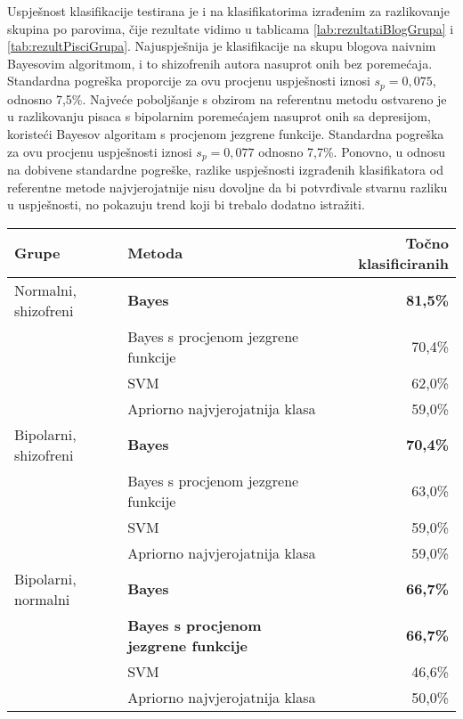 \documentclass[10pt, a4paper]{article}
\begin{document}
Uspješnost klasifikacije testirana je i na klasifikatorima izrađenim za razlikovanje skupina po parovima, čije rezultate vidimo u tablicama \ref{lab:rezultatiBlogGrupa} i \ref{tab:rezultPisciGrupa}. Najuspješnija je klasifikacije na skupu blogova naivnim Bayesovim algoritmom, i to shizofrenih autora nasuprot onih bez poremećaja. Standardna pogreška proporcije za ovu procjenu uspješnosti iznosi $s_p = 0,075$, odnosno 7,5\%. Najveće poboljšanje s obzirom na referentnu metodu ostvareno je u razlikovanju pisaca s bipolarnim poremećajem nasuprot onih sa depresijom, koristeći Bayesov algoritam s procjenom jezgrene funkcije. Standardna pogreška za ovu procjenu uspješnosti iznosi $s_p = 0,077$ odnosno 7,7\%. Ponovno, u odnosu na dobivene standardne pogreške, razlike uspješnosti izgrađenih klasifikatora od referentne metode najvjerojatnije nisu dovoljne da bi potvrđivale stvarnu razliku u uspješnosti, no pokazuju trend koji bi trebalo dodatno istražiti.

\begin{table*}
\caption{Postotak točno klasificiranih primjera na skupu blogova po parovima klasa korištenjem različitih algoritama.}
\label{lab:rezultatiBlogGrupa}
\begin{center}
\begin{tabular}{llr}
\toprule
Grupe & Metoda & Točno klasificiranih\\
\midrule
Normalni, shizofreni & \textbf{Bayes} & \textbf{81,5\%}\\
 & Bayes s procjenom jezgrene funkcije & 70,4\%\\
 & SVM & 62,0\%\\
 & Apriorno najvjerojatnija klasa & 59,0\%\\
\midrule
 Bipolarni, shizofreni &   \textbf{Bayes} &   \textbf{70,4\%}\\
 & Bayes s procjenom jezgrene funkcije & 63,0\%\\
 & SVM & 59,0\%\\
 & Apriorno najvjerojatnija klasa & 59,0\%\\
\midrule
Bipolarni, normalni & \textbf{Bayes} &  \textbf{66,7\%}\\
 &  \textbf{Bayes s procjenom jezgrene funkcije} &  \textbf{66,7\%}\\
 & SVM & 46,6\%\\
 & Apriorno najvjerojatnija klasa & 50,0\%\\
 \bottomrule
 \end{tabular}
 \end{center}
 \end{table*}
\end{document}
